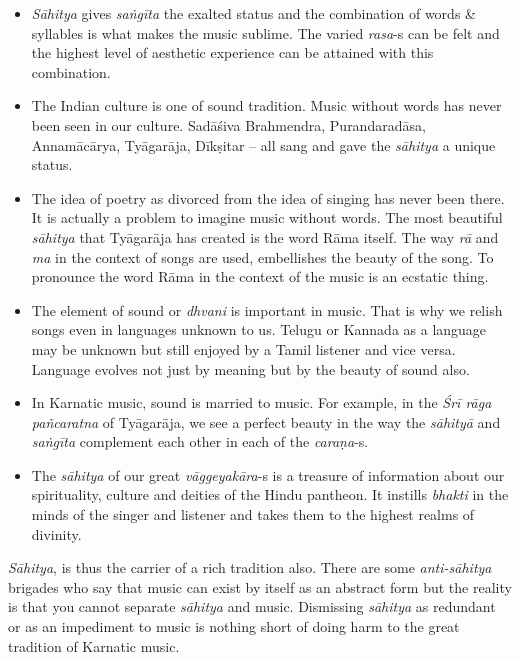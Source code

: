 \begin{itemize}
\itemsep=0pt
\item \textit{Sāhitya} gives \textit{saṅgīta} the exalted status and the combination of words \& syllables is what makes the music sublime. The varied \textit{rasa}-s can be felt and the highest level of aesthetic experience can be attained with this combination.

 \item The Indian culture is one of sound tradition. Music without words has never been seen in our culture. Sadāśiva Brahmendra, Purandaradāsa, Annamācārya, Tyāgarāja, Dīkṣitar – all sang and gave the \textit{sāhitya} a unique status. 

 \item The idea of poetry as divorced from the idea of singing has never been there. It is actually a problem to imagine music without words. The most beautiful \textit{sāhitya} that Tyāgarāja has created is the word Rāma itself. The way \textit{rā} and \textit{ma} in the context of songs are used, embellishes the beauty of the song. To pronounce the word Rāma in the context of the music is an ecstatic thing.

 \item The element of sound or \textit{dhvani} is important in music. That is why we relish songs even in languages unknown to us. Telugu or Kannada as a language may be unknown but still enjoyed by a Tamil listener and vice versa. Language evolves not just by meaning but by the beauty of sound also. 

 \item In Karnatic music, sound is married to music. For example, in the \textit{Śrī rāga pañcaratna} of Tyāgarāja, we see a perfect beauty in the way the \textit{sāhityā} and \textit{saṅgīta} complement each other in each of the \textit{caraṇa}-s.

 \item The \textit{sāhitya} of our great \textit{vāggeyakāra}-s is a treasure of information about our spirituality, culture and deities of the Hindu pantheon. It instills \textit{bhakti} in the minds of the singer and listener and takes them to the highest realms of divinity.

\end{itemize}

\textit{Sāhitya}, is thus the carrier of a rich tradition also. There are some \textit{anti-sāhitya} brigades who say that music can exist by itself as an abstract form but the reality is that you cannot separate \textit{sāhitya} and music. Dismissing \textit{sāhitya} as redundant or as an impediment to music is nothing short of doing harm to the great tradition of Karnatic music.

